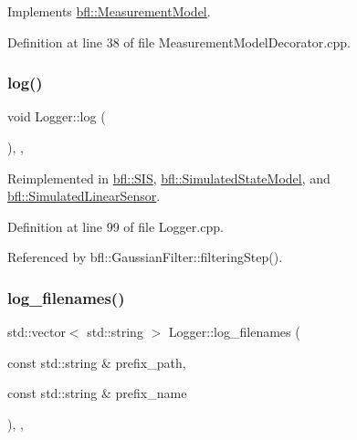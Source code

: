 Implements \mbox{\hyperlink{classbfl_1_1MeasurementModel_aa06e0643805551a981bcc013ad44c829}{bfl\+::\+Measurement\+Model}}.



Definition at line 38 of file Measurement\+Model\+Decorator.\+cpp.

\mbox{\label{classbfl_1_1Logger_ad44f46593cb8c4c87c1178eb326e2f64}} 
\subsubsection{\texorpdfstring{log()}{log()}}
{\footnotesize\ttfamily void Logger\+::log (\begin{DoxyParamCaption}{ }\end{DoxyParamCaption})\hspace{0.3cm}{\ttfamily [protected]}, {\ttfamily [virtual]}, {\ttfamily [inherited]}}



Reimplemented in \mbox{\hyperlink{classbfl_1_1SIS_aeb0b87af1cc1fc4b616989ef489ecccc}{bfl\+::\+S\+IS}}, \mbox{\hyperlink{classbfl_1_1SimulatedStateModel_aa022eb0d50d898ffcc831af2907265b2}{bfl\+::\+Simulated\+State\+Model}}, and \mbox{\hyperlink{classbfl_1_1SimulatedLinearSensor_ab75bbe744d8516c97dfc90ad499b10e6}{bfl\+::\+Simulated\+Linear\+Sensor}}.



Definition at line 99 of file Logger.\+cpp.



Referenced by bfl\+::\+Gaussian\+Filter\+::filtering\+Step().

\mbox{\label{classbfl_1_1Logger_a328ceaa8e70e6918f11142b12b8be217}} 
\subsubsection{\texorpdfstring{log\+\_\+filenames()}{log\_filenames()}}
{\footnotesize\ttfamily std\+::vector$<$ std\+::string $>$ Logger\+::log\+\_\+filenames (\begin{DoxyParamCaption}\item[{const std\+::string \&}]{prefix\+\_\+path,  }\item[{const std\+::string \&}]{prefix\+\_\+name }\end{DoxyParamCaption})\hspace{0.3cm}{\ttfamily [protected]}, {\ttfamily [virtual]}, {\ttfamily [inherited]}}



